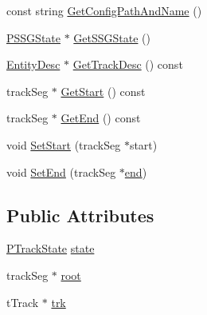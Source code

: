 \begin{DoxyCompactItemize}
\item 
const string \hyperlink{classprocedural_1_1_p_track_ac941debabef3877e1783bdd1d8e73103}{Get\-Config\-Path\-And\-Name} ()
\item 
\hyperlink{classprocedural_1_1_p_s_s_g_state}{P\-S\-S\-G\-State} $\ast$ \hyperlink{classprocedural_1_1_p_track_ac5216fd2958e7f530acd9fd67edec2c7}{Get\-S\-S\-G\-State} ()
\item 
\hyperlink{namespaceprocedural_ae4301ddb088c564b7e7b36903ecd6e23}{Entity\-Desc} $\ast$ \hyperlink{classprocedural_1_1_p_track_a4d3919f2ee4f9e4296a645a6d60fd16d}{Get\-Track\-Desc} () const 
\item 
track\-Seg $\ast$ \hyperlink{classprocedural_1_1_p_track_af15ce7f1926fd20caccf2e12f51a33bf}{Get\-Start} () const 
\item 
track\-Seg $\ast$ \hyperlink{classprocedural_1_1_p_track_abf00dcf59b99b7894fd36ec86e46a819}{Get\-End} () const 
\item 
void \hyperlink{classprocedural_1_1_p_track_ae136809d63983f1ec3835806fd55049c}{Set\-Start} (track\-Seg $\ast$start)
\item 
void \hyperlink{classprocedural_1_1_p_track_a56ea590d110ab46fbe7d3ae95d6198cb}{Set\-End} (track\-Seg $\ast$\hyperlink{classprocedural_1_1_p_track_ac9001885365980b067a13749419416e6}{end})
\end{DoxyCompactItemize}
\subsection*{Public Attributes}
\begin{DoxyCompactItemize}
\item 
\hyperlink{structprocedural_1_1_p_track_state}{P\-Track\-State} \hyperlink{classprocedural_1_1_p_track_a1ad479bf26237af933ae14a838b61046}{state}
\item 
track\-Seg $\ast$ \hyperlink{classprocedural_1_1_p_track_a29673df8a7e92648d375d64462334159}{root}
\item 
t\-Track $\ast$ \hyperlink{classprocedural_1_1_p_track_a7ff84df3ba51a2f6896160ead70e91f7}{trk}
\end{DoxyCompactItemize}
